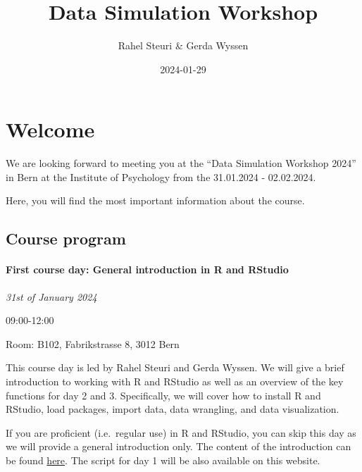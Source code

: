 \documentclass[
  letterpaper,
  DIV=11,
  numbers=noendperiod]{scrreprt}
\title{Data Simulation Workshop}
\author{Rahel Steuri \& Gerda Wyssen}
\date{2024-01-29}
\renewcommand*\contentsname{Table of contents}
\newcommand\contentsname{Table of contents}
\begin{document}
\maketitle
\renewcommand*\contentsname{Table of contents}
{
\hypersetup{linkcolor=}
\setcounter{tocdepth}{2}
\tableofcontents
}

\hypertarget{welcome}{%
\chapter*{Welcome}\label{welcome}}


We are looking forward to meeting you at the ``Data Simulation Workshop
2024'' in Bern at the Institute of Psychology from the 31.01.2024 -
02.02.2024.

Here, you will find the most important information about the course.

\hypertarget{course-program}{%
\section*{Course program}\label{course-program}}


\hypertarget{first-course-day-general-introduction-in-r-and-rstudio}{%
\subsubsection*{First course day: General introduction in R and
RStudio}\label{first-course-day-general-introduction-in-r-and-rstudio}}

\emph{31st of January 2024}

09:00-12:00

Room: B102, Fabrikstrasse 8, 3012 Bern

This course day is led by Rahel Steuri and Gerda Wyssen. We will give a
brief introduction to working with R and RStudio as well as an overview
of the key functions for day 2 and 3. Specifically, we will cover how to
install R and RStudio, load packages, import data, data wrangling, and
data visualization.

If you are proficient (i.e.~regular use) in R and RStudio, you can skip
this day as we will provide a general introduction only. The content of
the introduction can be found
\href{https://kogpsy.github.io/datasimulationcourse_24/introduction.html}{here}.
The script for day 1 will be also available on this website.
\end{document}
